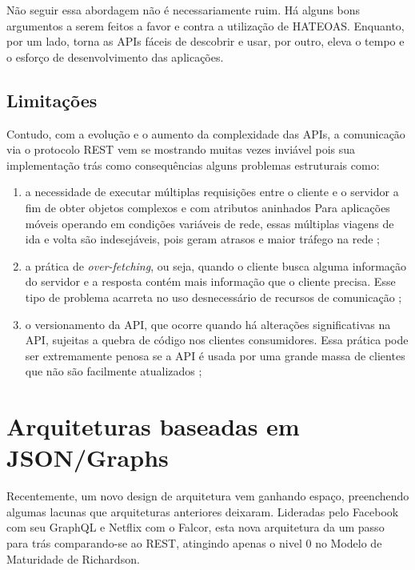 Não seguir essa abordagem não é necessariamente ruim. Há alguns bons argumentos a serem feitos a favor e contra a utilização de HATEOAS. Enquanto, por um lado, torna as APIs fáceis de descobrir e usar, por outro, eleva o tempo e o esforço de desenvolvimento das aplicações.

\subsection{Limitações}

Contudo, com a evolução e o aumento da complexidade das APIs, a comunicação via o protocolo REST vem se mostrando muitas vezes inviável pois sua implementação trás como consequências alguns problemas estruturais como:

\begin{enumerate}[label=\alph*)]

\item a necessidade de executar múltiplas requisições entre o cliente e o servidor a fim de obter objetos complexos e com atributos aninhados  Para aplicações móveis operando em condições variáveis de rede, essas múltiplas viagens de ida e volta são indesejáveis, pois geram atrasos e maior tráfego na rede \cite{graph-intro};

\item a prática de \textit{over-fetching}, ou seja, quando o cliente busca alguma informação do servidor e a resposta contém mais informação que o cliente precisa. Esse tipo de problema acarreta no uso desnecessário de recursos de comunicação  \cite{efficient-data-communication};

\item o versionamento da API, que ocorre quando há alterações significativas na API, sujeitas a quebra de código nos clientes consumidores. Essa prática pode ser extremamente penosa se a API é usada por uma grande massa de clientes que não são facilmente atualizados \cite{api-versioning};

\end{enumerate}

\section{Arquiteturas baseadas em JSON/Graphs}\label{sec:graph}

Recentemente, um novo design de arquitetura vem ganhando espaço, preenchendo algumas lacunas que arquiteturas anteriores deixaram. Lideradas pelo Facebook com seu GraphQL e Netflix com o Falcor, esta nova arquitetura da um passo para trás comparando-se ao REST, atingindo apenas o nivel 0 no Modelo de Maturidade de Richardson. 


